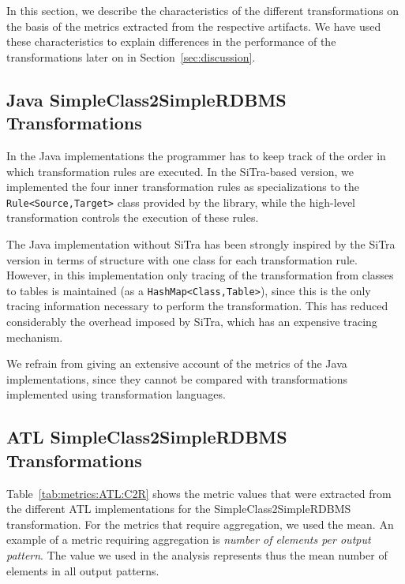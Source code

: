 \documentclass[12pt]{elsarticle}
\begin{document}
In this section, we describe the characteristics of the different transformations
on the basis of the metrics extracted from the respective artifacts.
We have used these characteristics to explain differences in the performance of the transformations later on in Section~\ref{sec:discussion}.

\subsection{Java SimpleClass2SimpleRDBMS Transformations}

In the Java implementations the programmer has to keep track of the
order in which transformation rules are
executed. In the SiTra-based version, we implemented the
four inner transformation rules as specializations to the
{\small \texttt{Rule<Source,Target>}} class provided by the library, while
the high-level transformation controls the execution of these rules.

The Java implementation without SiTra has been strongly inspired by the SiTra
version in terms of structure with one class for each transformation rule.
However, in this implementation only tracing of the transformation from classes
to tables is maintained (as a {\small \texttt{HashMap<Class,Table>}}), since
this is the only tracing information necessary to perform the transformation.
This has reduced considerably the overhead imposed by SiTra, which has an
expensive tracing mechanism.

We refrain from giving an extensive account of the metrics of the Java
implementations, since they cannot be compared with transformations implemented
using transformation languages.


\subsection{ATL SimpleClass2SimpleRDBMS Transformations}
Table~\ref{tab:metrics:ATL:C2R} shows the metric values that were extracted from
the different ATL implementations for the SimpleClass2SimpleRDBMS
transformation. For the metrics that require aggregation, we used the mean. An
example of a metric requiring aggregation is \emph{number of elements per output
pattern}. The value we used in the analysis represents thus the mean number of
elements in all output patterns.\\


\end{document}
